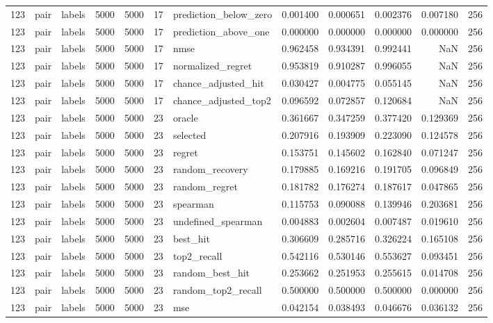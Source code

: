 \begin{tabular}{rllrrrlrrrrr}
123 & pair & labels & 5000 & 5000 & 17 & prediction_below_zero & 0.001400 & 0.000651 & 0.002376 & 0.007180 & 256 \\
123 & pair & labels & 5000 & 5000 & 17 & prediction_above_one & 0.000000 & 0.000000 & 0.000000 & 0.000000 & 256 \\
123 & pair & labels & 5000 & 5000 & 17 & nmse & 0.962458 & 0.934391 & 0.992441 & NaN & 256 \\
123 & pair & labels & 5000 & 5000 & 17 & normalized_regret & 0.953819 & 0.910287 & 0.996055 & NaN & 256 \\
123 & pair & labels & 5000 & 5000 & 17 & chance_adjusted_hit & 0.030427 & 0.004775 & 0.055145 & NaN & 256 \\
123 & pair & labels & 5000 & 5000 & 17 & chance_adjusted_top2 & 0.096592 & 0.072857 & 0.120684 & NaN & 256 \\
123 & pair & labels & 5000 & 5000 & 23 & oracle & 0.361667 & 0.347259 & 0.377420 & 0.129369 & 256 \\
123 & pair & labels & 5000 & 5000 & 23 & selected & 0.207916 & 0.193909 & 0.223090 & 0.124578 & 256 \\
123 & pair & labels & 5000 & 5000 & 23 & regret & 0.153751 & 0.145602 & 0.162840 & 0.071247 & 256 \\
123 & pair & labels & 5000 & 5000 & 23 & random_recovery & 0.179885 & 0.169216 & 0.191705 & 0.096849 & 256 \\
123 & pair & labels & 5000 & 5000 & 23 & random_regret & 0.181782 & 0.176274 & 0.187617 & 0.047865 & 256 \\
123 & pair & labels & 5000 & 5000 & 23 & spearman & 0.115753 & 0.090088 & 0.139946 & 0.203681 & 256 \\
123 & pair & labels & 5000 & 5000 & 23 & undefined_spearman & 0.004883 & 0.002604 & 0.007487 & 0.019610 & 256 \\
123 & pair & labels & 5000 & 5000 & 23 & best_hit & 0.306609 & 0.285716 & 0.326224 & 0.165108 & 256 \\
123 & pair & labels & 5000 & 5000 & 23 & top2_recall & 0.542116 & 0.530146 & 0.553627 & 0.093451 & 256 \\
123 & pair & labels & 5000 & 5000 & 23 & random_best_hit & 0.253662 & 0.251953 & 0.255615 & 0.014708 & 256 \\
123 & pair & labels & 5000 & 5000 & 23 & random_top2_recall & 0.500000 & 0.500000 & 0.500000 & 0.000000 & 256 \\
123 & pair & labels & 5000 & 5000 & 23 & mse & 0.042154 & 0.038493 & 0.046676 & 0.036132 & 256 \\

\end{tabular}
